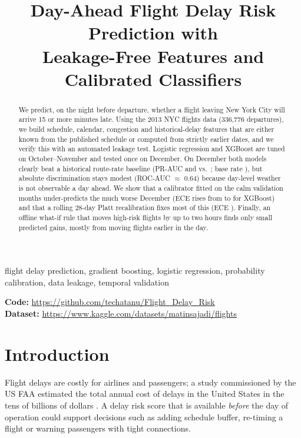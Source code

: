 \documentclass[conference]{IEEEtran}
\begin{document}
\title{Day-Ahead Flight Delay Risk Prediction with\\Leakage-Free Features and Calibrated Classifiers}

\author{
}

\maketitle

\begin{abstract}
We predict, on the night before departure, whether a flight leaving New York City
will arrive 15 or more minutes late. Using the 2013 NYC flights data
(336{,}776 departures), we build schedule, calendar, congestion and historical-delay
features that are either known from the published schedule or computed from strictly
earlier dates, and we verify this with an automated leakage test. Logistic regression
and XGBoost are tuned on October--November and tested once on December.
On December both models clearly beat a historical route-rate baseline
(PR-AUC \LRTestPRAUC{} and \XGBTestPRAUC{} vs.\ \RouteTestPRAUC{}; base rate \TestRate),
but absolute discrimination stays modest (ROC-AUC $\approx$ 0.64) because day-level
weather is not observable a day ahead. We show that a calibrator fitted on the calm
validation months under-predicts the much worse December (ECE rises from
\XGBRawECE{} to \XGBCalECE{} for XGBoost) and that a rolling 28-day Platt recalibration
fixes most of this (ECE \XGBRollECE). Finally, an offline what-if rule that moves
high-risk flights by up to two hours finds only small predicted gains, mostly from
moving flights earlier in the day.
\end{abstract}

\begin{IEEEkeywords}
flight delay prediction, gradient boosting, logistic regression, probability calibration, data leakage, temporal validation
\end{IEEEkeywords}

\noindent\textbf{Code:} \url{https://github.com/techatanu/Flight_Delay_Risk}\\
\textbf{Dataset:} \url{https://www.kaggle.com/datasets/matinsajadi/flights}

\section{Introduction}
Flight delays are costly for airlines and passengers; a study commissioned by the US
FAA estimated the total annual cost of delays in the United States in the tens of
billions of dollars \cite{ball2010}. A delay risk score that is available
\emph{before} the day of operation could support decisions such as adding schedule
buffer, re-timing a flight or warning passengers with tight connections.
\end{document}
